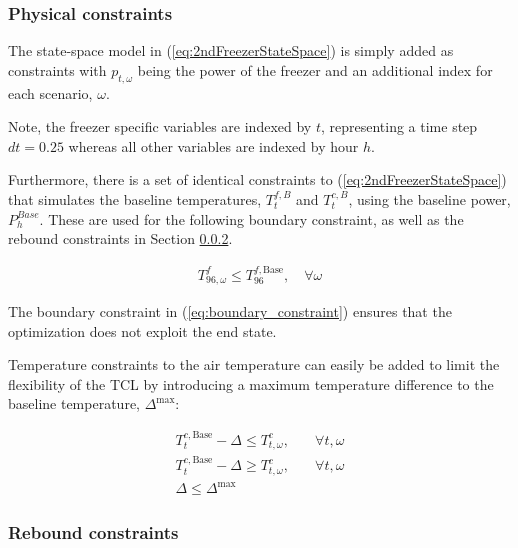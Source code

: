 {\subsubsection{Physical constraints}\label{sec:temperature_constraints}

The state-space model in (\ref{eq:2ndFreezerStateSpace}) is simply added as constraints with $p_{t,\omega}$ being the power of the freezer and an additional index for each scenario, $\omega$.

Note, the freezer specific variables are indexed by $t$, representing a time step $dt = 0.25$ whereas all other variables are indexed by hour $h$.

Furthermore, there is a set of identical constraints to (\ref{eq:2ndFreezerStateSpace}) that simulates the baseline temperatures, $T^{f,B}_{t}$ and $T^{c,B}_{t}$, using the baseline power, $P^{Base}_{h}$. These are used for the following boundary constraint, as well as the rebound constraints in Section \ref{sec:rebound_constraints}.

\begin{align}\label{eq:boundary_constraint}
    T^{f}_{96,\omega} \leq T^{f, \text{Base}}_{96}, \quad \forall{\omega}
\end{align}

The boundary constraint in (\ref{eq:boundary_constraint}) ensures that the optimization does not exploit the end state.

Temperature constraints to the air temperature can easily be added to limit the flexibility of the TCL by introducing a maximum temperature difference to the baseline temperature, $\Delta^{\text{max}}$:

\begin{subequations}\label{eq:delta_max_constraints}
    \begin{align}
        T^{c,\text{Base}}_{t} - \Delta \leq T^{c}_{t, \omega}, \quad & \forall{t, \omega} \\
        T^{c,\text{Base}}_{t} - \Delta \geq T^{c}_{t, \omega}, \quad & \forall{t, \omega} \\
        \Delta \leq \Delta^{\text{max}}
    \end{align}
\end{subequations}

\subsubsection{Rebound constraints}\label{sec:rebound_constraints}

}
